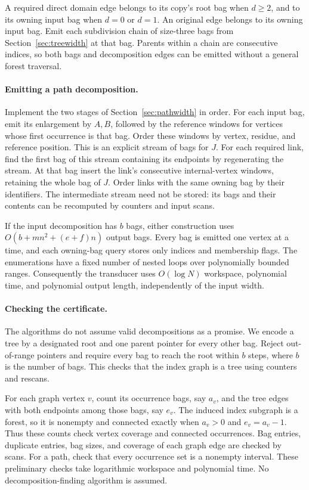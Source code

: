 \documentclass[11pt]{article}
\theoremstyle{remark}
\begin{document}
A required direct domain edge belongs to its copy's root bag when $d\geq2$,
and to its owning input bag when $d=0$ or $d=1$. An original edge belongs
to its owning input bag. Emit each subdivision chain of size-three bags
from Section~\ref{sec:treewidth} at that bag. Parents within a chain are
consecutive indices, so both bags and decomposition edges can be emitted
without a general forest traversal.

\paragraph{Emitting a path decomposition.}
Implement the two stages of Section~\ref{sec:pathwidth} in order.
For each input bag, emit its enlargement by $A,B$, followed by the
reference windows for vertices whose first occurrence is that bag.
Order these windows by vertex, residue, and reference position. This
is an explicit stream of bags for $J$. For each required link, find
the first bag of this stream containing its endpoints by regenerating
the stream. At that bag insert the link's consecutive internal-vertex
windows, retaining the whole bag of $J$. Order links with the same
owning bag by their identifiers. The intermediate stream need not be
stored: its bags and their contents can be recomputed by counters and
input scans.

If the input decomposition has $b$ bags, either construction uses
$O(b+mn^2+(e+f)n)$ output bags. Every bag is emitted one vertex at a
time, and each owning-bag query stores only indices and membership flags.
The enumerations have a fixed number of nested loops over polynomially
bounded ranges. Consequently the transducer uses $O(\log N)$ workspace,
polynomial time, and polynomial output length, independently of the
input width.

\paragraph{Checking the certificate.}
The algorithms do not assume valid decompositions as a promise.
We encode a tree by a designated root and one parent
pointer for every other bag. Reject out-of-range pointers and require
every bag to reach the root within $b$ steps, where $b$ is the number of
bags. This checks that the index graph is a tree using counters and
rescans.

For each graph vertex $v$, count its occurrence bags, say $a_v$, and
the tree edges with both endpoints among those bags, say $e_v$.
The induced index subgraph is a forest, so it is nonempty and connected
exactly when $a_v>0$ and $e_v=a_v-1$. Thus these counts check vertex
coverage and connected occurrences. Bag entries, duplicate entries,
bag sizes, and coverage of each graph edge are checked by scans.
For a path, check that every occurrence set is a nonempty interval.
These preliminary checks take logarithmic workspace and polynomial time.
No decomposition-finding algorithm is assumed.
\end{document}
